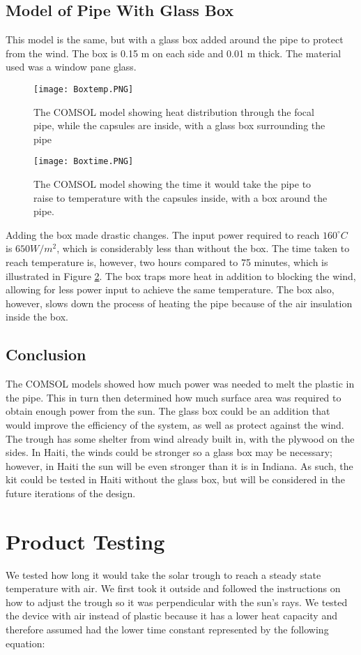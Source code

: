 \documentclass[11pt,english]{article}
\begin{document}
\subsection{Model of Pipe With Glass Box}
This model is the same, but with a glass box added around the pipe to protect from the wind. The box is 0.15 m on each side and 0.01 m thick. The material used was a window pane glass.
\begin{figure}[h!]
\centering
\texttt{[image: Boxtemp.PNG]}
\caption{The COMSOL model showing heat distribution through the focal pipe, while the capsules are inside, with a glass box surrounding the pipe}
\label{fig:cshfwithbox}
\end{figure}
\begin{figure}[h!]
\centering
\texttt{[image: Boxtime.PNG]}
\caption{The COMSOL model showing the time it would take the pipe to raise to temperature with the capsules inside, with a box around the pipe.}
\label{fig:COMSOL Box Time}
\end{figure}

\noindent Adding the box made drastic changes. The input power required to reach $160^{\circ}C$ is $650 W/m^2$, which is considerably less than without the box. The time taken to reach temperature is, however, two hours compared to 75 minutes, which is illustrated in Figure \ref{fig:COMSOL Box Time}. The box traps more heat in addition to blocking the wind, allowing for less power input to achieve the same temperature. The box also, however, slows down the process of heating the pipe because of the air insulation inside the box.
\subsection{Conclusion}
The COMSOL models showed how much power was needed to melt the plastic in the pipe. This in turn then determined how much surface area was required to obtain enough power from the sun. The glass box could be an addition that would improve the efficiency of the system, as well as protect against the wind. The trough has some shelter from wind already built in, with the plywood on the sides. In Haiti, the winds could be stronger so a glass box may be necessary; however, in Haiti the sun will be even stronger than it is in Indiana. As such, the kit could be tested in Haiti without the glass box, but will be considered in the future iterations of the design.
\label{App:AppendixB}

\section{Product Testing} 
\label{App:AppendixC}
We tested how long it would take the solar trough to reach a steady state temperature with air. We first took it outside and followed the instructions on how to adjust the trough so it was perpendicular with the sun’s rays. We tested the device with air instead of plastic because it has a lower heat capacity and therefore assumed had the lower time constant represented by the following equation:
\end{document}
